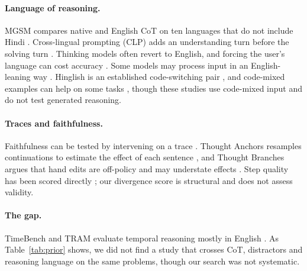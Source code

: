 \documentclass[11pt]{article}
\begin{document}
\paragraph{Language of reasoning.}
MGSM compares native and English CoT on ten languages that do not include Hindi \citep{shi-etal-2023-mgsm}. Cross-lingual prompting (CLP) adds an understanding turn before the solving turn \citep{qin-etal-2023-cross}. Thinking models often revert to English, and forcing the user's language can cost accuracy \citep{qi-etal-2025-models,yong2025crosslingual}. Some models may process input in an English-leaning way \citep{wendler-etal-2024-llamas,zhao2024handle}. Hinglish is an established code-switching pair \citep{khanuja-etal-2020-gluecos,aguilar-etal-2020-lince}, and code-mixed examples can help on some tasks \citep{shankar-etal-2024-context}, though these studies use code-mixed input and do not test generated reasoning.

\paragraph{Traces and faithfulness.}
Faithfulness can be tested by intervening on a trace \citep{lanham-etal-2023-measuring}. Thought Anchors resamples continuations to estimate the effect of each sentence \citep{bogdan-etal-2025-anchors}, and Thought Branches argues that hand edits are off-policy and may understate effects \citep{macar-etal-2026-branches}. Step quality has been scored directly \citep{golovneva2023roscoe,prasad-etal-2023-receval}; our divergence score is structural and does not assess validity.

\paragraph{The gap.}
TimeBench and TRAM evaluate temporal reasoning mostly in English \citep{chu-etal-2024-timebench,wang-zhao-2024-tram}. As Table~\ref{tab:prior} shows, we did not find a study that crosses CoT, distractors and reasoning language on the same problems, though our search was not systematic.
\end{document}
